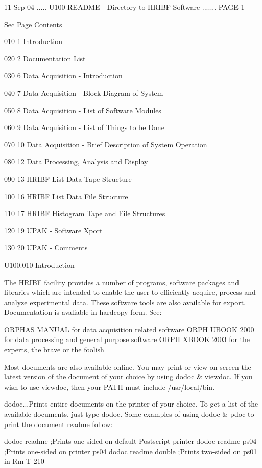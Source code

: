    11-Sep-04 ..... U100  README - Directory to HRIBF Software ....... PAGE   1
 
 
   Sec Page Contents
 
   010   1  Introduction
 
   020   2  Documentation List
 
   030   6  Data Acquisition - Introduction
 
   040   7  Data Acquisition - Block Diagram of System
 
   050   8  Data Acquisition - List of Software Modules
 
   060   9  Data Acquisition - List of Things to be Done
 
   070  10  Data Acquisition - Brief Description of System Operation
 
   080  12  Data Processing, Analysis and Display
 
   090  13  HRIBF List Data Tape Structure
 
   100  16  HRIBF List Data File Structure
 
   110  17  HRIBF Histogram Tape and File Structures
 
   120  19  UPAK - Software Xport
 
   130  20  UPAK - Comments
 
 
   U100.010  Introduction
 
   The  HRIBF  facility  provides  a number of programs, software packages and
   libraries which are intended to enable the  user  to  efficiently  acquire,
   process  and  analyze  experimental  data.  These  software  tools are also
   available for export. Documentation is avaliable in hardcopy form. See:
 
   ORPHAS MANUAL   for data acquisition related software
   ORPH UBOOK 2000 for data processing and general purpose software
   ORPH XBOOK 2003 for the experts, the brave or the foolish
 
   Most documents are also available online. You may print or  view  on-screen
   the latest version of the document of your choice by using dodoc & viewdoc.
   If you wish to use viewdoc, then your PATH must include /usr/local/bin.
 
   dodoc...Prints  entire  documents  on  the printer of your choice. To get a
          list of the available documents, just type dodoc.  Some  examples of
          using dodoc & pdoc to print the document readme follow:
 
          dodoc readme         ;Prints one-sided on default Postscript printer
          dodoc readme ps04    ;Prints one-sided on printer ps04
          dodoc readme double  ;Prints two-sided on  ps01 in Rm T-210
 
